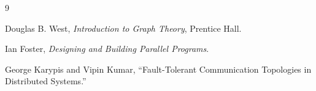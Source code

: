 \documentclass[11pt]{article}
\begin{document}


\begin{thebibliography}{9}

Douglas B. West,
\textit{Introduction to Graph Theory},
Prentice Hall.

Ian Foster,
\textit{Designing and Building Parallel Programs}.

George Karypis and Vipin Kumar,
``Fault-Tolerant Communication Topologies in Distributed Systems.''

\end{thebibliography}
\end{document}
